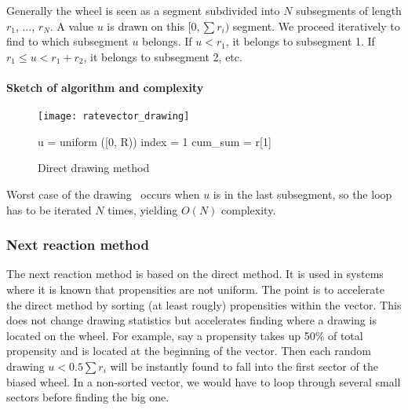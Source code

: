 Generally the wheel is seen as a segment subdivided into $N$ subsegments of length $r_1$, ..., $r_N$. A value $u$ is drawn on this $[0, \sum r_i)$ segment. We proceed iteratively to find to which subsegment $u$ belongs. If $u < r_1$, it belongs to subsegment 1. If $r_1 \leq u < r_1+r_2$, it belongs to subsegment 2, etc.

\paragraph {Sketch of algorithm and complexity}

\begin{figure}[!h]
  \begin{minipage}{0.5\textwidth}
    \texttt{[image: ratevector\_drawing]}
  \end{minipage}
  \begin{minipage}{0.5\textwidth}
    \begin{algorithm}[H]
      u = uniform ([0, R))\;
        index = 1\;
        cum\_sum = r[1]\;
    \end{algorithm}
  \end{minipage}
  \caption{Direct drawing method}
  \label{fig:direct_drawing}
\end {figure}

Worst case of the drawing~ occurs when $u$ is in the last subsegment, so the loop has to be iterated $N$ times, yielding $O(N)$ complexity.

\subsubsection {Next reaction method}

The next reaction method is based on the direct method. It is used in systems where it is known that propensities are not uniform. The point is to accelerate the direct method by sorting (at least rougly) propensities within the vector. This does not change drawing statistics but accelerates finding where a drawing is located on the wheel. For example, say a propensity takes up 50\% of total propensity and is located at the beginning of the vector. Then each random drawing $u < 0.5\sum r_i$ will be instantly found to fall into the first sector of the biased wheel. In a non-sorted vector, we would have to loop through several small sectors before finding the big one.

